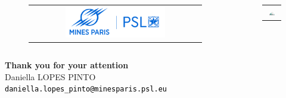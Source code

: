 \documentclass[9pt]{beamer}
\begin{document}
\begin{frame}{}

    \begin{columns}

        \begin{column}{0.6\textwidth}
            \begin{figure}
                \begin{tabular}{c}
                    \includegraphics[width=0.6\textwidth]{TEMPLATE_IMAGES/MINES.png} \\
                \end{tabular}
            \end{figure}
        \end{column}

        \begin{column}{0.4\textwidth}
            \begin{figure}
                \begin{tabular}{c}
                    \includegraphics[width=0.5\textwidth]{TEMPLATE_IMAGES/MESSIAH.pdf} \\
                \end{tabular}
            \end{figure}
        \end{column}

    \end{columns}

    \vspace{0.5cm}

    \noindent\makebox[\linewidth]{\rule{1.0\textwidth}{0.4pt}}

    \vspace{0.3cm}

    \begin{center}
        \Huge{\textcolor{MINESBlue}{\textbf{Thank you for your attention}}} \\
        \vspace{1.0cm}
        \normalsize Daniella LOPES PINTO \\
        \vspace{0.1cm}
        \small \texttt{\textcolor{black}{daniella.lopes\_pinto@minesparis.psl.eu}}
    \end{center}


\end{frame}
\end{document}
